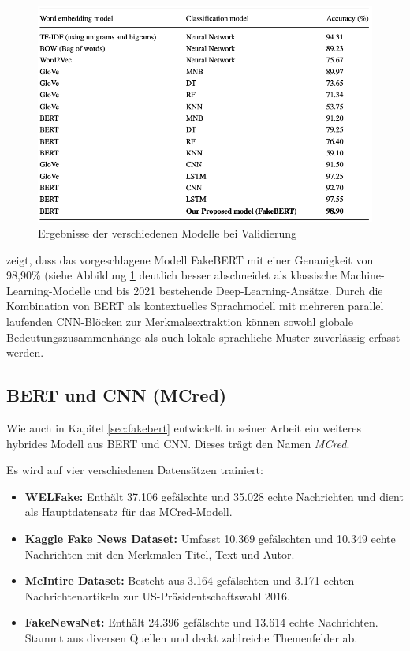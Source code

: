 \begin{figure}[htbp]
    \begin{center}
    \includegraphics[scale=0.5]{static/bert_cnn_fakebert.png}
    \caption{\label{fig:bert_cnn_fakebert} Ergebnisse der verschiedenen Modelle bei Validierung \cite{Kaliyar:2021aa}}
    \end{center}
\end{figure}

\cite{Kaliyar:2021aa} zeigt, dass das vorgeschlagene Modell FakeBERT mit einer Genauigkeit von 98,90\% (siehe Abbildung \ref{fig:bert_cnn_fakebert} 
deutlich besser abschneidet als klassische Machine-Learning-Modelle und bis 2021 bestehende Deep-Learning-Ansätze. Durch die Kombination von BERT als 
kontextuelles Sprachmodell mit mehreren parallel laufenden CNN-Blöcken zur Merkmalsextraktion können sowohl globale Bedeutungszusammenhänge als auch 
lokale sprachliche Muster zuverlässig erfasst werden.

\subsection{BERT und CNN (MCred)}

Wie auch in Kapitel \ref{sec:fakebert} entwickelt \cite{Verma:2023aa} in seiner Arbeit ein weiteres hybrides Modell aus BERT und CNN.
Dieses trägt den Namen \textit{MCred}.

Es wird auf vier verschiedenen Datensätzen trainiert:
\begin{itemize}
  \item \textbf{WELFake:} Enthält 37.106 gefälschte und 35.028 echte Nachrichten und dient als Hauptdatensatz für das MCred-Modell.
  \item \textbf{Kaggle Fake News Dataset:} Umfasst 10.369 gefälschten und 10.349 echte Nachrichten mit den Merkmalen Titel, Text und Autor. 
  \item \textbf{McIntire Dataset:} Besteht aus 3.164 gefälschten und 3.171 echten Nachrichtenartikeln zur US-Präsidentschaftswahl 2016.
  \item \textbf{FakeNewsNet:} Enthält 24.396 gefälschte und 13.614 echte Nachrichten. Stammt aus diversen Quellen und deckt zahlreiche Themenfelder ab.
\end{itemize}

